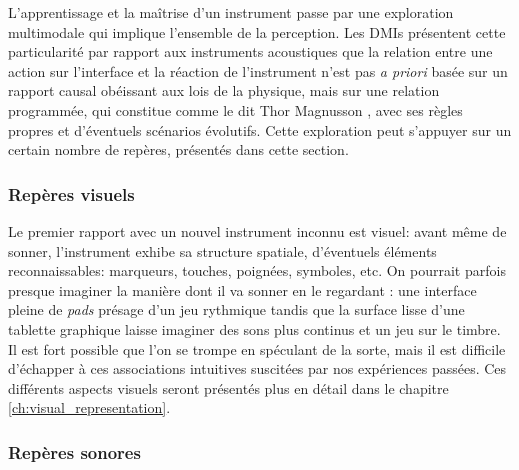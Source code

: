 \noindent L'apprentissage et la maîtrise d'un instrument passe par une exploration multimodale qui implique l'ensemble de la perception. Les \glspl{DMI} présentent cette particularité par rapport aux instruments acoustiques que la relation entre une action sur l'interface et la réaction de l'instrument n'est pas \textit{a priori} basée sur un rapport causal obéissant aux lois de la physique, mais sur une relation programmée, qui constitue comme le dit Thor Magnusson  \cite{magnusson_sonic_2019}, avec ses règles propres et d'éventuels scénarios évolutifs. Cette exploration peut s'appuyer sur un certain nombre de repères, présentés dans cette section.

\subsubsection{Repères visuels}

\noindent Le premier rapport avec un nouvel instrument inconnu est visuel: avant même de sonner, l'instrument exhibe sa structure spatiale, d'éventuels éléments reconnaissables: marqueurs, touches, poignées, symboles, etc. On pourrait parfois presque imaginer la manière dont il va sonner en le regardant : une interface pleine de \textit{pads} présage d'un jeu rythmique tandis que la surface lisse d'une tablette graphique laisse imaginer des sons plus continus et un jeu sur le timbre. Il est fort possible que l'on se trompe en spéculant de la sorte, mais il est difficile d'échapper à ces associations intuitives suscitées par nos expériences passées. Ces différents aspects visuels seront présentés plus en détail dans le chapitre \ref{ch:visual_representation}.

\subsubsection{Repères sonores}

